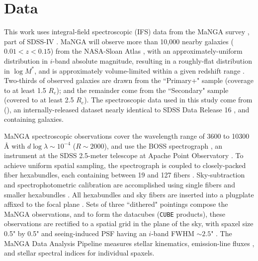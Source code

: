 \section{Data}
\label{sec:data}

This work uses integral-field spectroscopic (IFS) data from the MaNGA survey \citep{bundy15_manga}, part of SDSS-IV \citep{blanton_17_sdss-iv}. MaNGA will observe more than 10,000 nearby galaxies ($0.01 < z < 0.15$) from the NASA-Sloan Atlas \citep[NSA, ][]{blanton_11_nsa}, with an approximately-uniform distribution in $i$-band absolute magnitude, resulting in a roughly-flat distribution in $\log M^*$, and is approximately volume-limited within a given redshift range \citep{manga_sample_wake_17}. Two-thirds of observed galaxies are drawn from the ``Primary+" sample (coverage to at least 1.5 $R_e$); and the remainder come from the ``Secondary" sample (covered to at least 2.5 $R_e$). The spectroscopic data used in this study come from \mplvfull (\mplv), an internally-released dataset nearly identical to SDSS Data Release 16 \citep{sdss_dr16}, and containing \mplvngal galaxies.

MaNGA spectroscopic observations cover the wavelength range of 3600 to 10300 $\mbox{\AA}$ with $d\log\lambda \sim 10^{-4}$ ($R \sim 2000$), and use the BOSS spectrograph \citep{smee_boss_instrument, sdss_boss_dawson_13}, an instrument at the SDSS 2.5-meter telescope at Apache Point Observatory \citep{gunn_sdss_telescope}. To achieve uniform spatial sampling, the spectrograph is coupled to closely-packed fiber hexabundles, each containing between 19 and 127 fibers \citep{manga_inst}. Sky-subtraction and spectrophotometric calibration are accomplished using single fibers and smaller hexabundles \citep{manga_drp, manga_spectrophot}. All hexabundles and sky fibers are inserted into a plugplate affixed to the focal plane \citep{sdss_summary}. Sets of three ``dithered" pointings compose the MaNGA observations, and to form the datacubes (\texttt{CUBE} products), these observations are rectified to a spatial grid in the plane of the sky, with spaxel size 0.5" by 0.5" and seeing-induced PSF having an $i$-band FWHM $\sim 2.5$" \citep{manga_obs, manga_progress_yan_16, manga_drp}. The MaNGA Data Analysis Pipeline \citep[DAP, ][]{manga_dap} measures stellar kinematics, emission-line fluxes \citep{belfiore_2019_mangadap-emissionline}, and stellar spectral indices for individual spaxels.

